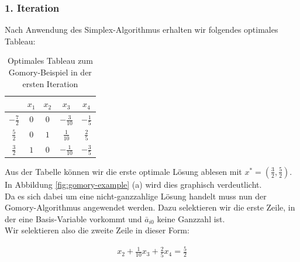 \documentclass[tog]{acmsiggraph}
\begin{document}
\subsubsection*{1. Iteration}

Nach Anwendung des Simplex-Algorithmus erhalten wir folgendes optimales Tableau:


\begin{table}[ht]
\begin{center}

\centering
\caption{Optimales Tableau zum Gomory-Beispiel in der ersten Iteration}
\label{Tb:Optimales Tableau Gomory Beispiel}
\begin{tabular}{ccccc}
& $x_1$ & $x_2$  & $x_3$ & $x_4$ \\
\hline
\multicolumn{1}{|c|}{\rule{0pt}{3.5ex}\large$-\frac{7}{2}$} & \large$0$  & \large$0$ & \large$-\frac{3}{10}$ & \multicolumn{1}{c|}{\large$-\frac{1}{5}$} \\[2ex] \hline
\multicolumn{1}{|c|}{\rule{0pt}{3.5ex}\large$\frac{5}{2}$} & \large$0$ & \large$1$ & \large$\frac{1}{10}$ & \multicolumn{1}{c|}{\large$\frac{2}{5}$} \\[2ex]
\multicolumn{1}{|c|}{\rule{0pt}{3.5ex}\large$\frac{3}{2}$} & \large$1$ & \large$0$ & \large$-\frac{1}{10}$ & \multicolumn{1}{c|}{\large$-\frac{3}{5}$} \\[2ex] \hline                 
\end{tabular}
\end{center}
\end{table}

Aus der Tabelle können wir die erste optimale Lösung ablesen mit $x^* = (\frac{3}{2}, \frac{5}{2})$. In Abbildung \ref{fig:gomory-example} (a) wird dies graphisch verdeutlicht.\\
Da es sich dabei um eine nicht-ganzzahlige Lösung handelt muss nun der Gomory-Algorithmus angewendet werden. Dazu selektieren wir die erste Zeile, in der eine Basis-Variable vorkommt und $\bar{a}_{i0}$ keine Ganzzahl ist.\\
Wir selektieren also die zweite Zeile in dieser Form:

\large
\begin{align}
\label{Eq:Gomory-Beispiel It 1}
x_2 + \frac{1}{10} x_3 + \frac{2}{5} x_4 = \frac{5}{2}
\end{align}
\normalsize
\end{document}
